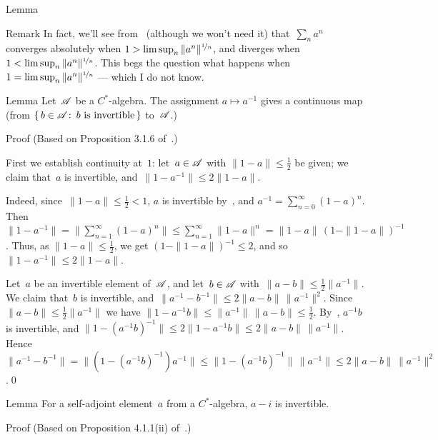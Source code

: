 \documentclass[a]{subfiles}
\begin{document}
\begin{parsec}
\begin{point}{Lemma}
\begin{point}{Remark}
In fact,
we'll see from~
(although we won't need it)
that~$\sum_n a^n$
converges absolutely when $1>\limsup_n \|a^n\|^{\nicefrac{1}{n}}$,
and diverges when $1<\limsup_n \|a^n\|^{\nicefrac{1}{n}}$.
This begs the question
what happens when $1=\limsup_n \|a^n\|^{\nicefrac{1}{n}}$
--- which I do not know.
\end{point}
\end{point}
\begin{point}{Lemma}%
Let~$\mathscr{A}$ be a $C^*$-algebra.
The assignment $a\mapsto a^{-1}$
gives a  continuous map
(from $\{\,b\in \mathscr{A}\colon\, \text{$b$ is invertible}\,\}$
to~$\mathscr{A}$.)
\begin{point}{Proof}
(Based on Proposition 3.1.6 of~\cite{kr}.)

First we establish continuity at~$1$:
let~$a\in\mathscr{A}$ with $\|1-a\|\leq \frac{1}{2}$ be given;
we claim that~$a$ is invertible,
and~$\|1-a^{-1}\| \leq 2\|1-a\|$.

Indeed, since~$\|1-a\|\leq \frac{1}{2}<1$,
$a$ is invertible by~,
and $a^{-1}=\sum_{n=0}^\infty (1-a)^n$.
Then~$\|1-a^{-1}\|=\|\sum_{n=1}^\infty (1-a)^n\|\leq \sum_{n=1}^\infty \|1-a\|^n
= \|1-a\|\, (1-\|1-a\|)^{-1}$.
Thus, as $\|1-a\|\leq\frac{1}{2}$,
we get $(1-\|1-a\|)^{-1}\leq 2$,
and so $\|1-a^{-1}\|\leq 2\|1-a\|$.
\begin{point}%
Let~$a$ be an invertible element of~$\mathscr{A}$,
and let~$b\in\mathscr{A}$ with~$\|a-b\|\leq\frac{1}{2}\|a^{-1}\|$.
We claim that~$b$ is invertible,
and~$\|a^{-1}-b^{-1}\|\leq 2\|a-b\|\,\|a^{-1}\|^2$.
Since $\|a-b\|\leq \frac{1}{2}\|a^{-1}\|$
we have
$\|1-a^{-1}b\|\leq \|a^{-1}\|\,\|a-b\|\leq \frac{1}{2}$.
By~, $a^{-1}b$ is invertible,
and $\|1-(a^{-1}b)^{-1}\|\leq 2\|1-a^{-1}b\|\leq 2\|a-b\|\,\|a^{-1}\|$.
Hence $\|a^{-1}-b^{-1}\| = \|(1-(a^{-1}b)^{-1})a^{-1}\|
\leq \|1-(a^{-1}b)^{-1}\|\,\|a^{-1}\|\leq 2 \|a-b\|\,\|a^{-1}\|^2$.\qed
\end{point}
\end{point}
\end{point}
%
%
\begin{point}{Lemma}%
For a self-adjoint element~$a$ from a $C^*$-algebra,
$a-i$ is invertible.
\begin{point}{Proof}%
(Based on Proposition 4.1.1(ii) of~.)


\end{point}
\end{point}
\end{parsec}
\end{document}
